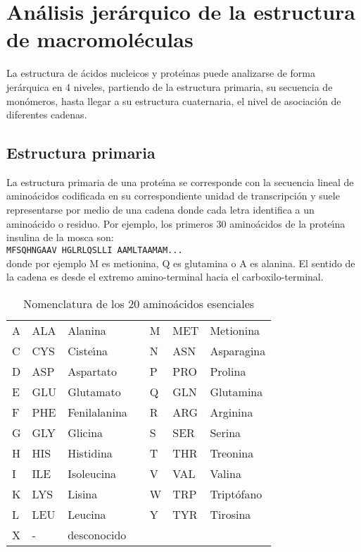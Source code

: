 \section{An\'{a}lisis jer\'{a}rquico de la estructura de macromol\'{e}culas}

La estructura de \'{a}cidos nucleicos y prote\'\i{}nas puede analizarse de forma jer\'{a}rquica en 4 niveles, partiendo de
la estructura primaria, su secuencia de mon\'{o}meros, hasta llegar a su estructura cuaternaria, el nivel de asociaci\'{o}n
de diferentes cadenas. 

\subsection{Estructura primaria} 

La estructura primaria de una prote\'\i{}na se corresponde con la secuencia lineal de amino\'{a}cidos codificada
en su correspondiente unidad de transcripci\'{o}n y suele representarse por medio de una cadena donde cada 
letra identifica a un amino\'{a}cido o residuo. Por ejemplo, los primeros 30 amino\'{a}cidos de la prote\'\i{}na 
insulina de la mosca  son:\\ 

\texttt{MFSQHNGAAV HGLRLQSLLI AAMLTAAMAM...}\\

donde por ejemplo M es metionina, Q es glutamina o A es alanina. %
El sentido de la cadena es desde el extremo amino-terminal hacia el carboxilo-terminal. 

\begin{table}[h]
\begin{center}
\begin{scriptsize}
\begin{tabular}{|l|l|l|l|l|l|l|}\hline
A & ALA & Alanina & & M & MET & Metionina\\   
C & CYS & Ciste\'\i{}na & & N & ASN & Asparagina\\
D & ASP & Aspartato & & P & PRO & Prolina\\ 
E & GLU & Glutamato & & Q & GLN & Glutamina\\  
F & PHE & Fenilalanina & & R & ARG & Arginina\\
G & GLY & Glicina & & S & SER & Serina\\      
H & HIS & Histidina & & T & THR & Treonina\\    
I & ILE & Isoleucina & & V & VAL & Valina\\   
K & LYS & Lisina & & W & TRP & Tript\'{o}fano\\
L & LEU & Leucina & & Y & TYR & Tirosina\\
X & -   & desconocido & & & &\\\hline
\end{tabular}
\end{scriptsize}
\end{center}
\caption%
{Nomenclatura de los 20 amino\'{a}cidos esenciales}
\label{tab:amino}
\end{table}

